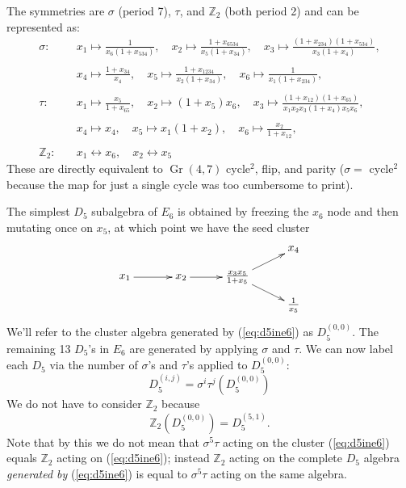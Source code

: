 \documentclass[11pt]{article}
\DeclareMathOperator{\Gr}{Gr}
\begin{document}
The symmetries are $\sigma$ (period 7), $\tau$, and $\mathbb{Z}_2$ (both period 2) and can be represented as:
\begin{align*}
	\sigma:\quad &x_1\mapsto \frac{1}{x_6
   \left(1+x_{534}\right)}, \quad x_2\mapsto \frac{1+x_{6534}}{x_5
   \left(1+x_{34}\right)}, \quad x_3\mapsto
   \frac{\left(1+x_{234}\right)
   \left(1+x_{534}\right)}{x_3
   \left(1+x_4\right)},\\ \\ 
   &x_4\mapsto
   \frac{1+x_{34}}{x_4}, \quad x_5\mapsto \frac{1+x_{1234}}{x_2
   \left(1+x_{34}\right)}, \quad x_6\mapsto \frac{1}{x_1
   \left(1+x_{234}\right)},\\ \\
   \tau: \quad&x_1\mapsto \frac{x_5}{1+x_{65}},\quad x_2\mapsto
   \left(1+x_5\right) x_6,\quad x_3\mapsto
   \frac{\left(1+x_{12}\right)
   \left(1+x_{65}\right)}{x_1 x_2 x_3 \left(1+x_4\right)
   x_5 x_6},\\ \\ 
   &x_4\mapsto x_4,\quad x_5\mapsto x_1
   \left(1+x_2\right),\quad x_6\mapsto
   \frac{x_2}{1+x_{12}},\\ \\
   \mathbb{Z}_2:\quad &x_1 \leftrightarrow x_6, \quad x_2 \leftrightarrow x_5
\end{align*}
These are directly equivalent to $\Gr(4,7)$ cycle$^2$, flip, and parity ($\sigma = $ cycle$^2$ because the map for just a single cycle was too cumbersome to print).

The simplest $D_5$ subalgebra of $E_6$ is obtained by freezing the $x_6$ node and then mutating once on $x_5$, at which point we have the seed cluster
\begin{equation}\label{eq:d5ine6}
\begin{gathered}
\begin{xy} 0;<1pt,0pt>:<0pt,-1pt>::
	(0,25) *+{x_1} ="1",
	(50,25) *+{x_2} ="2",
	(100,25) *+{\frac{x_3 x_5}{1+x_5}} ="3",
	(150,0) *+{x_4} ="4",
	(150,50) *+{\frac{1}{x_5}} ="5",
	"1", {\ar"2"},
	"2", {\ar"3"},
	"3", {\ar"4"},
	"3", {\ar"5"},
\end{xy}
\end{gathered}
\end{equation}
We'll refer to the cluster algebra generated by (\ref{eq:d5ine6}) as $D_5^{(0,0)}$. The remaining 13 $D_5$'s in $E_6$ are generated by applying $\sigma$ and $\tau$. We can now label each $D_5$ via the number of $\sigma$'s and $\tau$'s applied to $D_5^{(0,0)}$:
\begin{equation}
	D_5^{(i,j)} = \sigma^{i}\tau^j(D_5^{(0,0)})
\end{equation}
We do not have to consider $\mathbb{Z}_2$ because 
\begin{equation}
	\mathbb{Z}_2(D_5^{(0,0)}) = D_5^{(5,1)}.
\end{equation}
Note that by this we do not mean that $\sigma^5\tau$ acting on the cluster (\ref{eq:d5ine6}) equals $\mathbb{Z}_2$ acting on (\ref{eq:d5ine6}); instead $\mathbb{Z}_2$ acting on the complete $D_5$ algebra \emph{generated by} (\ref{eq:d5ine6}) is equal to $\sigma^5\tau$ acting on the same algebra.
\end{document}
